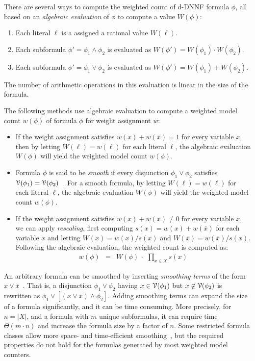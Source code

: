 \documentclass[letterpaper,USenglish,cleveref, autoref, thm-restate]{lipics-v2021}
\newcommand{\obar}[1]{\overline{#1}}
\newcommand{\lit}{\ell}
\newcommand{\varset}{X}
\newcommand{\dependencyset}{{\cal V}}
\begin{document}
There are several ways to compute the weighted count of d-DNNF formula $\phi$, all
based on an \emph{algebraic evaluation} of $\phi$ to compute a value $W(\phi)$:
\begin{enumerate}
\item Each literal $\lit$ is a assigned a rational value $W(\lit)$.
\item Each subformula $\phi' = \phi_1 \land \phi_2$ is evaluated as $W(\phi') = W(\phi_1) \cdot W(\phi_2)$.
\item Each subformula $\phi' = \phi_1 \lor \phi_2$ is evaluated as $W(\phi') = W(\phi_1) + W(\phi_2)$.
\end{enumerate}
The number of arithmetic operations in this evaluation is linear in the size of the formula.

The following methods use algebraic evaluation to compute a weighted model count $w(\phi)$ of formula $\phi$ for weight assignment $w$:
\begin{itemize}
\item If the weight assignment satisfies $w(x) + w(\obar{x}) = 1$  for every variable $x$,
  then by letting $W(\lit) = w(\lit)$ for each literal $\lit$, the algebraic evaluation $W(\phi)$ will yield the weighted model count $w(\phi)$.
\item Formula $\phi$ is said to be \emph{smooth} if every disjunction $\phi_1 \lor \phi_2$ satisfies
  $\dependencyset(\phi_1) = \dependencyset(\phi_2)$~\cite{darwiche:jancl:2001,darwiche:jair:2002}.  For a smooth formula, 
by letting $W(\lit) = w(\lit)$ for each literal $\lit$, the algebraic evaluation $W(\phi)$ will yield the weighted model count $w(\phi)$.
\item If the weight assignment satisfies $w(x) + w(\obar{x}) \not = 0$ for every variable $x$,
  we can apply \emph{rescaling}, first computing $s(x) = w(x) + w(\obar{x})$ for each variable $x$
  and letting $W(x) = w(x)/s(x)$ and $W(\obar{x}) = w(\obar{x})/s(x)$.  
  Following the algebraic evaluation, the weighted count is computed as:
  \begin{eqnarray}
w(\phi) &=& W(\phi)\; \cdot \;  \prod_{x\in\varset} s(x)  \label{eqn:rescale}
  \end{eqnarray}
\end{itemize}

An arbitrary formula can be smoothed by inserting \emph{smoothing terms} of the form $x \lor \obar{x}$~\cite{darwiche:jancl:2001}.
That is,
  a disjunction $\phi_1 \lor \phi_2$ having $x \in \dependencyset(\phi_1)$ but
  $x \not\in \dependencyset(\phi_2)$ is rewritten as $\phi_1 \lor [(x \lor \obar{x}) \land \phi_2]$.
  Adding smoothing terms can expand the size of a formula significantly, and it can be time consuming.
  More precisely, for $n = |X|$, and a formula with $m$ unique subformulas, it can require time $\Theta(m\cdot n)$ and increase the formula size by a factor of $n$.
  Some restricted formula classes allow more space- and time-efficient smoothing~\cite{shih:neurips:2019}, but the required properties do not hold for the formulas generated by most weighted model counters.
  
\end{document}
